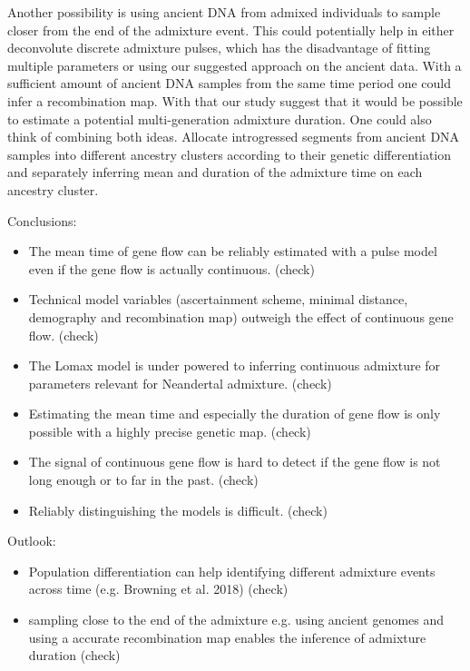 \documentclass[]{article}
\begin{document}
 Another possibility is using ancient DNA from admixed individuals to sample closer from the end of the admixture event. This could potentially help in either deconvolute discrete admixture pulses, which has the disadvantage of fitting multiple parameters or using our suggested approach on the ancient data. With a sufficient amount of ancient DNA samples from the same time period one could infer a recombination map. With that our study suggest that it would be possible to estimate a potential multi-generation admixture duration. One could also think of combining both ideas. Allocate introgressed segments from ancient DNA samples into different ancestry clusters according to their genetic differentiation and separately inferring mean and duration of the admixture time on each ancestry cluster. 

Conclusions:

\begin{itemize}
    \item The mean time of gene flow can be reliably estimated with a pulse model even if the gene flow is actually continuous. (check)
  \item Technical model variables (ascertainment scheme, minimal distance, demography and recombination map) outweigh the effect of continuous gene flow. (check)
  \item The Lomax model is under powered to inferring continuous admixture for parameters relevant for Neandertal admixture. (check)
  \item Estimating  the mean time and especially the duration of gene flow is only possible with a highly precise genetic map. (check)
  \item The signal of continuous gene flow is hard to detect if the gene flow is not long enough or to far in the past. (check)
  \item Reliably distinguishing the models is difficult. (check)
\end{itemize}

Outlook:

\begin{itemize}
  \item Population differentiation can help identifying different admixture events across time (e.g. Browning et al. 2018) (check)
  \item sampling close to the end of the admixture e.g. using ancient genomes and using a accurate recombination map enables the inference of admixture duration (check)
  
\end{itemize}
\end{document}

